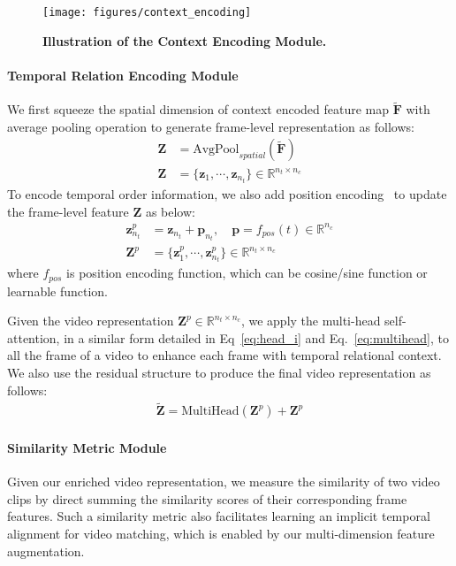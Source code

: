 \documentclass{article}
\begin{document}
\begin{figure}[t]
    \centering
    \texttt{[image: figures/context\_encoding]}
\caption{\textbf{Illustration of the Context Encoding Module.}}\vspace{-3mm}
    \label{fig:context_encoding}
\end{figure}	
\paragraph{Temporal Relation Encoding Module} We first squeeze the spatial dimension of context encoded feature map $\widetilde{\mathbf{F}}$ with average pooling operation to generate frame-level representation as follows:
\begin{align}
	\mathbf{Z}&= \text{AvgPool}_{spatial}(\widetilde{\mathbf{F}})\\
	\mathbf{Z}&=\{\mathbf{z}_1,\cdots,\mathbf{z}_{n_t}\}\in\mathbb{R}^{n_t\times n_{c}}
\end{align}
To encode temporal order information, we also add position encoding~\cite{vaswani2017attention} to update the frame-level feature $\mathbf{Z}$ as below:
\begin{align}
	\mathbf{z}_{n_t}^p&=\mathbf{z}_{n_t} + \mathbf{p}_{n_t},\quad \mathbf{p}=f_{pos}(t)\in\mathbb{R}^{n_c}\\
	\mathbf{Z}^{p} &=\{\mathbf{z}_1^p,\cdots,\mathbf{z}_{n_t}^p\}\in\mathbb{R}^{n_t\times n_{c}}
\end{align}
where $f_{pos}$ is position encoding function, which can be cosine/sine function or learnable function.


Given the video representation $\mathbf{Z}^p\in\mathbb{R}^{n_t\times n_{c}}$, we apply the multi-head self-attention, in a similar form detailed in Eq~\ref{eq:head_i} and Eq.~\ref{eq:multihead}, to all the frame of a video to enhance each frame with temporal relational context. We also use the residual structure to produce the final video representation as follows:
\begin{align}
	\widetilde{\mathbf{Z}}=\text{MultiHead}(\mathbf{Z}^p) + \mathbf{Z}^p
\end{align}


\paragraph{Similarity Metric Module}
Given our enriched video representation, we measure the similarity of two video clips by direct summing the similarity scores of their corresponding frame features. Such a similarity metric also facilitates learning an implicit temporal alignment for video matching, which is enabled by our multi-dimension feature augmentation. 
\end{document}
